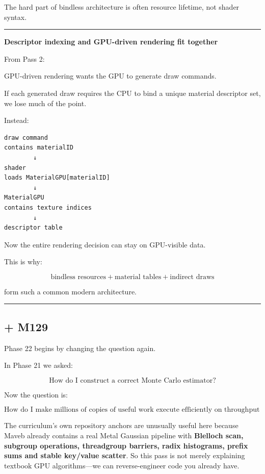 The hard part of bindless architecture is often resource lifetime, not shader syntax.

\begin{center}\rule{0.5\linewidth}{0.5pt}\end{center}

\textbf{Descriptor indexing and GPU-driven rendering fit together}

From Pass 2:

GPU-driven rendering wants the GPU to generate draw commands.

If each generated draw requires the CPU to bind a unique material descriptor set, we lose much of the point.

Instead:

\begin{verbatim}
draw command
contains materialID
        ↓
shader
loads MaterialGPU[materialID]
        ↓
MaterialGPU
contains texture indices
        ↓
descriptor table
\end{verbatim}

Now the entire rendering decision can stay on GPU-visible data.

This is why:

\[
\boxed{
\text{bindless resources}
+
\text{material tables}
+
\text{indirect draws}
}
\]

form such a common modern architecture.

\begin{center}\rule{0.5\linewidth}{0.5pt}\end{center}

\subsection{+ M129}\label{03-visual-computing-i-ch015-m129}

Phase 22 begins by changing the question again.

In Phase 21 we asked:

\[
\boxed{\text{How do I construct a correct Monte Carlo estimator?}}
\]

Now the question is:

\[
\boxed{\text{How do I make millions of copies of useful work execute efficiently on throughput hardware?}}
\]

The curriculum's own repository anchors are unusually useful here because Maveb already contains a real Metal Gaussian pipeline with \textbf{Blelloch scan, subgroup operations, threadgroup barriers, radix histograms, prefix sums and stable key/value scatter}. So this pass is not merely explaining textbook GPU algorithms---we can reverse-engineer code you already have.

